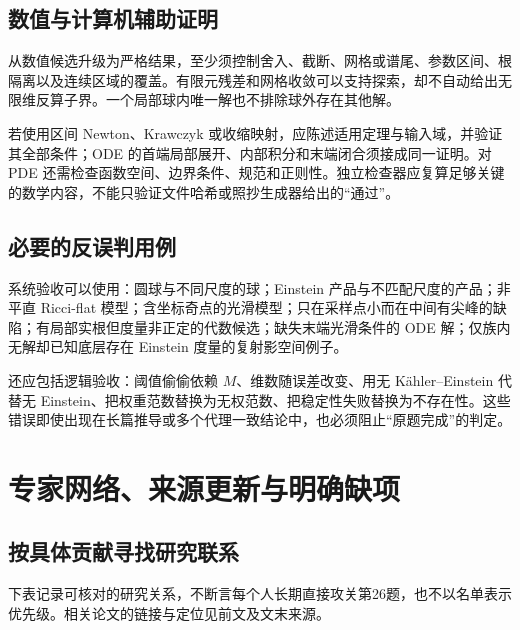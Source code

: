 \documentclass[11pt,a4paper]{article}
\theoremstyle{definition}
\begin{document}
\subsection{数值与计算机辅助证明}

从数值候选升级为严格结果，至少须控制舍入、截断、网格或谱尾、参数区间、根隔离以及连续区域的覆盖。有限元残差和网格收敛可以支持探索，却不自动给出无限维反算子界。一个局部球内唯一解也不排除球外存在其他解。

若使用区间 Newton、Krawczyk 或收缩映射，应陈述适用定理与输入域，并验证其全部条件；ODE 的首端局部展开、内部积分和末端闭合须接成同一证明。对 PDE 还需检查函数空间、边界条件、规范和正则性。独立检查器应复算足够关键的数学内容，不能只验证文件哈希或照抄生成器给出的“通过”。

\subsection{必要的反误判用例}

系统验收可以使用：圆球与不同尺度的球；Einstein 产品与不匹配尺度的产品；非平直 Ricci-flat 模型；含坐标奇点的光滑模型；只在采样点小而在中间有尖峰的缺陷；有局部实根但度量非正定的代数候选；缺失末端光滑条件的 ODE 解；仅族内无解却已知底层存在 Einstein 度量的复射影空间例子。

还应包括逻辑验收：阈值偷偷依赖 $M$、维数随误差改变、用无 Kähler--Einstein 代替无 Einstein、把权重范数替换为无权范数、把稳定性失败替换为不存在性。这些错误即使出现在长篇推导或多个代理一致结论中，也必须阻止“原题完成”的判定。

\section{专家网络、来源更新与明确缺项}

\subsection{按具体贡献寻找研究联系}

下表记录可核对的研究关系，不断言每个人长期直接攻关第26题，也不以名单表示优先级。相关论文的链接与定位见前文及文末来源。
\end{document}
